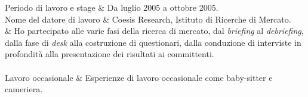 {\small Periodo di lavoro e stage}				& Da luglio 2005 a ottobre 2005.\\
{\small Nome del datore di lavoro}				& Coesis Research, Istituto di Ricerche di Mercato.\\
\hspace{6.5pt}{\small Principali mansioni e responsabilit\`a}	& Ho partecipato alle varie fasi della ricerca di mercato, dal {\em brief\mbox{}ing} al {\em debrief\mbox{}ing}, dalla fase di {\em desk} alla costruzione di questionari, dalla conduzione di interviste in profondit\`a alla presentazione dei risultati ai committenti.\\
\\[-7pt]
{\small Lavoro occasionale}					& Esperienze di lavoro occasionale come baby-sitter e cameriera.\\





